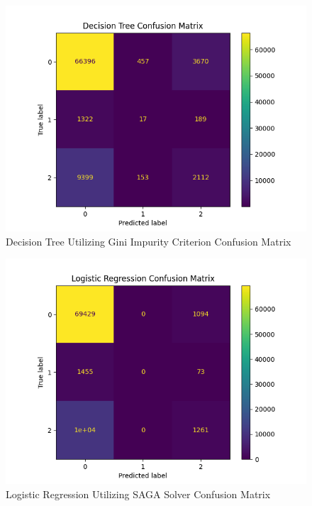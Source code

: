 \documentclass[journal]{IEEEtran}
\begin{document}
\begin{figure}[h!]
    \includegraphics[scale=0.5]{Decision Tree_cm.png}
    \centering
    \caption{Decision Tree Utilizing Gini Impurity Criterion Confusion Matrix}
    \label{fig:dtree}
\end{figure}

\begin{figure}[h!]
    \includegraphics[scale=0.5]{Logistic Regression_cm.png}
    \centering
    \caption{Logistic Regression Utilizing SAGA Solver Confusion Matrix}
    \label{fig:logreg}
    \end{figure}
\end{document}
